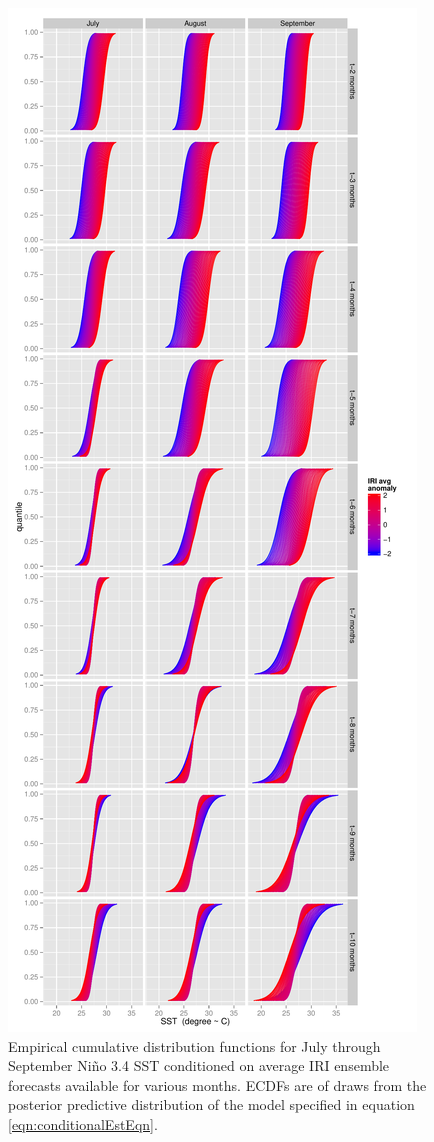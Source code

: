 \documentclass[authoryear]{article}
\begin{document}
\begin{figure}[!htbp]
  \includegraphics[width=\linewidth]{Pricingfigs/conditionalCDFs07to09TraditionalCDFconfig}
  \caption{Empirical cumulative distribution functions for July through September Ni\~no 3.4 SST conditioned on average IRI ensemble forecasts available for various months. ECDFs are of draws from the posterior predictive distribution of the model specified in equation \ref{eqn:conditionalEstEqn}.}
   \label{fig:conditionalCDFs07to09}
\end{figure}
\end{document}
